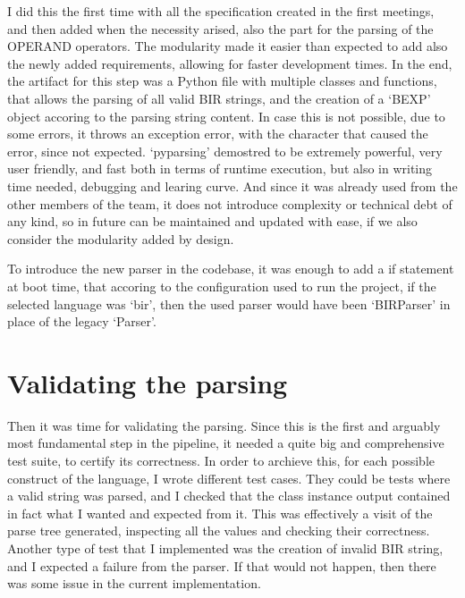 I did this the first time with all the specification created in the first meetings,
and then added when the necessity arised, also the part for the parsing of the OPERAND
operators. The modularity made it easier than expected to add also the newly
added requirements, allowing for faster development times. In the end, the artifact
for this step was a Python file with multiple classes and functions, that allows
the parsing of all valid BIR strings, and the creation of a `BEXP' object accoring
to the parsing string content. In case this is not possible, due to some errors,
it throws an exception error, with the character that caused the error, since
not expected. `pyparsing' demostred to be extremely powerful, very user friendly,
and fast both in terms of runtime execution, but also in writing time needed, debugging
and learing curve. And since it was already used from the other members of the
team, it does not introduce complexity or technical debt of any kind, so in
future can be maintained and updated with ease, if we also consider the modularity
added by design.

To introduce the new parser in the codebase, it was enough to add a if statement
at boot time, that accoring to the configuration used to run the project, if the
selected language was `bir', then the used parser would have been `BIRParser' in
place of the legacy `Parser'.

\section{Validating the parsing}
\label{cha:Validating the parsing} Then it was time for validating the parsing.
Since this is the first and arguably most fundamental step in the pipeline, it needed
a quite big and comprehensive test suite, to certify its correctness. In order to
archieve this, for each possible construct of the language, I wrote different test
cases. They could be tests where a valid string was parsed, and I checked that the
class instance output contained in fact what I wanted and expected from it. This
was effectively a visit of the parse tree generated, inspecting all the values and
checking their correctness. Another type of test that I implemented was the
creation of invalid BIR string, and I expected a failure from the parser. If
that would not happen, then there was some issue in the current implementation.

